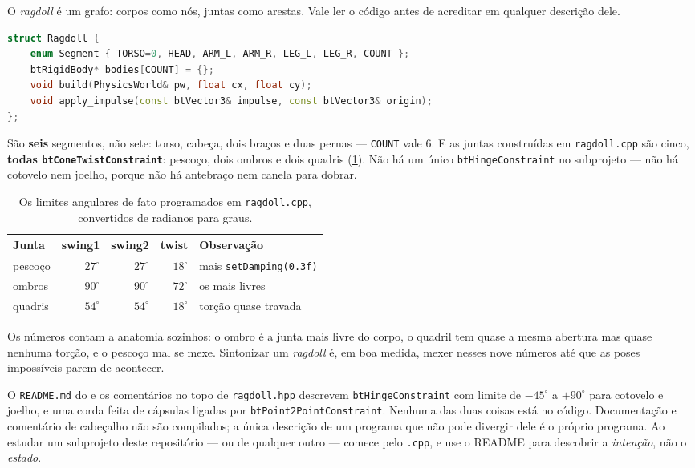 O \emph{ragdoll} é um grafo: corpos como nós, juntas como arestas. Vale ler o
código antes de acreditar em qualquer descrição dele.

\begin{lstlisting}[style=bt, language=C++,
    caption={A enumeração inteira --- \texttt{src/sfml\_bullet2/ragdoll.hpp}.}]
struct Ragdoll {
    enum Segment { TORSO=0, HEAD, ARM_L, ARM_R, LEG_L, LEG_R, COUNT };
    btRigidBody* bodies[COUNT] = {};
    void build(PhysicsWorld& pw, float cx, float cy);
    void apply_impulse(const btVector3& impulse, const btVector3& origin);
};
\end{lstlisting}

São \textbf{seis} segmentos, não sete: torso, cabeça, dois braços e duas pernas
--- \texttt{COUNT} vale 6. E as juntas construídas em \texttt{ragdoll.cpp} são
cinco, \textbf{todas \texttt{btConeTwistConstraint}}: pescoço, dois ombros e dois
quadris (\cref{tab:ragdoll-juntas}). Não há um único
\texttt{btHingeConstraint} no subprojeto --- não há cotovelo nem joelho, porque
não há antebraço nem canela para dobrar.

\begin{table}[htbp]
\centering
\caption{Os limites angulares de fato programados em \texttt{ragdoll.cpp},
         convertidos de radianos para graus.}
\label{tab:ragdoll-juntas}
\footnotesize
\begin{tabular}{@{}lrrrl@{}}
\toprule
\textbf{Junta} & \textbf{swing1} & \textbf{swing2} & \textbf{twist} & \textbf{Observação} \\
\midrule
pescoço  & $27^\circ$ & $27^\circ$ & $18^\circ$ & mais \texttt{setDamping(0.3f)} \\
ombros   & $90^\circ$ & $90^\circ$ & $72^\circ$ & os mais livres \\
quadris  & $54^\circ$ & $54^\circ$ & $18^\circ$ & torção quase travada \\
\bottomrule
\end{tabular}
\end{table}

Os números contam a anatomia sozinhos: o ombro é a junta mais livre do corpo, o
quadril tem quase a mesma abertura mas quase nenhuma torção, e o pescoço mal se
mexe. Sintonizar um \emph{ragdoll} é, em boa medida, mexer nesses nove números
até que as poses impossíveis parem de acontecer.

\begin{armadilha}
O \texttt{README.md} do  e os comentários no topo de
\texttt{ragdoll.hpp} descrevem \texttt{btHingeConstraint} com limite de
$-45^\circ$ a $+90^\circ$ para cotovelo e joelho, e uma corda feita de cápsulas
ligadas por \texttt{btPoint2PointConstraint}. Nenhuma das duas coisas está no
código. Documentação e comentário de cabeçalho não são compilados; a única
descrição de um programa que não pode divergir dele é o próprio programa. Ao
estudar um subprojeto deste repositório --- ou de qualquer outro --- comece pelo
\texttt{.cpp}, e use o README para descobrir a \emph{intenção}, não o
\emph{estado}.
\end{armadilha}

